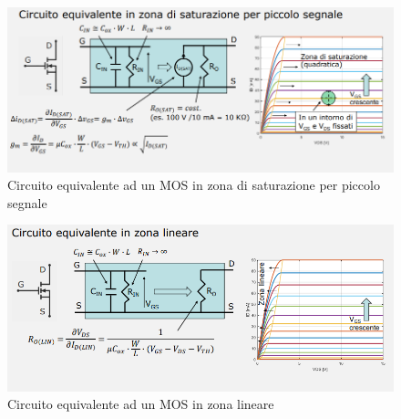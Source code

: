 \documentclass{article}
\begin{document}
\begin{figure}[h]
  \centering
  \includegraphics[scale=0.55]{IM_MOS_equivalente_saturazione_bis}
  \caption{Circuito equivalente ad un MOS in zona di saturazione per piccolo segnale}
  \label{Schema_MOS_equivalente_saturazione_bis}
\end{figure}

\begin{figure}[h]
  \centering
  \includegraphics[scale=0.55]{IM_MOS_equivalente_lineare}
  \caption{Circuito equivalente ad un MOS in zona lineare}
  \label{Schema_MOS_equivalente_lineare}
\end{figure}
\end{document}
